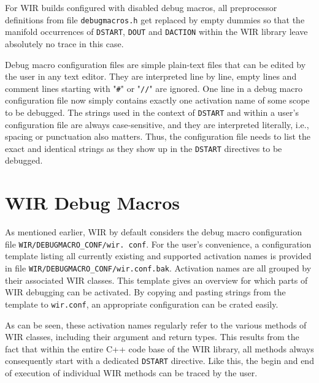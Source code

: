 For \gls{WIR} builds configured with disabled debug macros, all preprocessor definitions from file \texttt{debugmacros.h} get replaced by empty dummies so that the manifold occurrences of \texttt{DSTART}, \texttt{DOUT} and \texttt{DACTION} within the \gls{WIR} library leave absolutely no trace in this case.

Debug macro configuration files are simple plain-text files that can be edited by the user in any text editor.
They are interpreted line by line, empty lines and comment lines starting with "\texttt{\#}" or "\texttt{//}" are ignored.
One line in a debug macro configuration file now simply contains exactly one activation name of some scope to be debugged.
The strings used in the context of \texttt{DSTART} and within a user's configuration file are always case-sensitive, and they are interpreted literally, i.e., spacing or punctuation also matters.
Thus, the configuration file needs to list the exact and identical strings as they show up in the \texttt{DSTART} directives to be debugged.


\section{WIR Debug Macros}
\label{sec:wirmacros}

As mentioned earlier, \gls{WIR} by default considers the debug macro configuration file \texttt{WIR/DEBUGMACRO\_CONF/wir. conf}.
For the user's convenience, a configuration template listing all currently existing and supported activation names is provided in file \texttt{WIR/DEBUGMACRO\_CONF/wir.conf.bak}.
Activation names are all grouped by their associated \gls{WIR} classes.
This template gives an overview for which parts of \gls{WIR} debugging can be activated.
By copying and pasting strings from the template to \texttt{wir.conf}, an appropriate configuration can be crated easily.

As can be seen, these activation names regularly refer to the various methods of \gls{WIR} classes, including their argument and return types.
This results from the fact that within the entire C++ code base of the \gls{WIR} library, all methods always consequently start with a dedicated \texttt{DSTART} directive.
Like this, the begin and end of execution of individual \gls{WIR} methods can be traced by the user.

